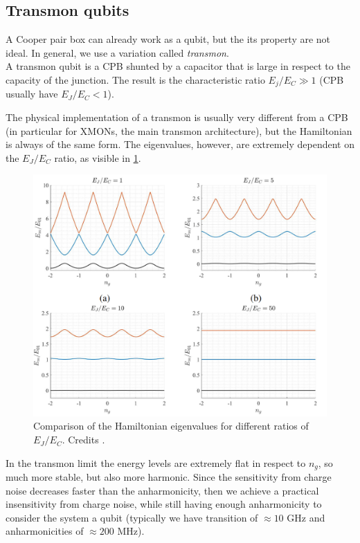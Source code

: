 
\subsection{Transmon qubits}

A Cooper pair box can already work as a qubit, but the its property are not ideal.
In general, we use a variation called \textit{transmon}.\\
A transmon qubit is a CPB shunted by a capacitor that is large in respect to the capacity of the junction.
The result is the characteristic ratio $E_j/E_C \gg 1$ (CPB usually have $E_J/E_C < 1$).

The physical implementation of a transmon is usually very different from a CPB (in particular for XMONs, the main transmon architecture), but the Hamiltonian is always of the same form.
The eigenvalues, however, are extremely dependent on the $E_J/E_C$ ratio, as visible in \cref{fig:levels-ratio}.
\begin{figure}[ht]
    \centering
    \includegraphics[width=\textwidth]{Theory/figures/levels_ratio.png}
    \caption[Comparison of qubit Hamiltonian eigenvalues for different ratios of $E_J/E_C$.]{Comparison of the Hamiltonian eigenvalues for different ratios of $E_J/E_C$. Credits \cite{Roth2021}.}
    \label{fig:levels-ratio}
\end{figure}
In the transmon limit the energy levels are extremely flat in respect to $n_g$, so much more stable, but also more harmonic.
Since the sensitivity from charge noise decreases faster than the anharmonicity, then we achieve a practical insensitivity from charge noise, while still having enough anharmonicity to consider the system a qubit (typically we have transition of $\approx 10$ GHz and anharmonicities of $\approx 200$ MHz).

